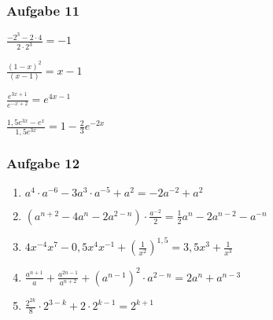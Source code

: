 \subsubsection{Aufgabe 11}
\begin{enumerate}
\begin{multicols}{2}
	\item \quad $ \frac{-2^3 - 2 \cdot 4}{2 \cdot 2^3} =-1 $																%
	\item \quad $ \frac{(1-x)^2}{(x-1)} =x-1 $																%
	\item \quad $ \frac{e^{3x+1}}{e^{-x+2}} =e^{4x-1} $													%
	\item \quad $ \frac{1,5e^{3x} - e^x}{1,5e^{3x}} =1 - \frac{2}{3}e^{-2x} $						%
	\end{multicols} 
\end{enumerate}

\subsubsection{Aufgabe 12}
\begin{enumerate}
	\item \quad $ a^4 \cdot a^{-6} - 3a^3 \cdot a^{-5} + a^2 =-2a^{-2} + a^2 $										%
	\item \quad $ (a^{n+2} - 4a^n - 2a^{2-n})\cdot \frac{a^{-2}}{2} =\frac{1}{2}a^n - 2a^{n-2} -a^{-n} $	%
	\item \quad $ 4x^{-4}x^7 - 0,5 x^4x^{-1} + \left(\frac{1}{x^2}\right)^{1,5} =3,5x^3 + \frac{1}{x^3} $						%
	\item \quad $ \frac{a^{n+1}}{a} + \frac{a^{2n-1}}{a^{n+2}} + (a^{n-1})^2 \cdot a^{2-n} =2a^n + a^{n-3} $										%
	\item \quad $ \frac{2^{2k}}{8} \cdot 2^{3-k} + 2 \cdot 2^{k-1} =2^{k+1} $														%
\end{enumerate}

